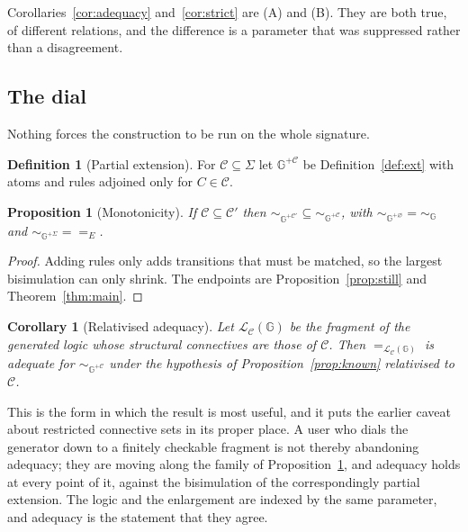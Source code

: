 \documentclass[11pt]{article}
\theoremstyle{plain}
\newtheorem{proposition}[theorem]{Proposition}
\newtheorem{corollary}[theorem]{Corollary}
\theoremstyle{definition}
\newtheorem{definition}[theorem]{Definition}
\newcommand{\Gg}{\mathbb{G}}
\newcommand{\Lo}{\mathcal{L}}
\newcommand{\bis}{\sim}
\begin{document}
Corollaries~\ref{cor:adequacy} and~\ref{cor:strict} are (A) and (B). They are both true, of different
relations, and the difference is a parameter that was suppressed rather than a disagreement.

\subsection{The dial}
\label{sec:dial}

Nothing forces the construction to be run on the whole signature.

\begin{definition}[Partial extension]
For $\mathcal{C} \subseteq \Sigma$ let $\Gg^{+\mathcal{C}}$ be Definition~\ref{def:ext} with atoms and
rules adjoined only for $C \in \mathcal{C}$.
\end{definition}

\begin{proposition}[Monotonicity]
\label{prop:mono}
If $\mathcal{C} \subseteq \mathcal{C}'$ then $\bis_{\Gg^{+\mathcal{C}'}} \subseteq
\bis_{\Gg^{+\mathcal{C}}}$, with $\bis_{\Gg^{+\varnothing}} = \bis_\Gg$ and
$\bis_{\Gg^{+\Sigma}} = {=_E}$.
\end{proposition}

\begin{proof}
Adding rules only adds transitions that must be matched, so the largest bisimulation can only shrink.
The endpoints are Proposition~\ref{prop:still} and Theorem~\ref{thm:main}.
\end{proof}

\begin{corollary}[Relativised adequacy]
Let $\Lo_\mathcal{C}(\Gg)$ be the fragment of the generated logic whose structural connectives are
those of $\mathcal{C}$. Then $=_{\Lo_\mathcal{C}(\Gg)}$ is adequate for $\bis_{\Gg^{+\mathcal{C}}}$
under the hypothesis of Proposition~\ref{prop:known} relativised to $\mathcal{C}$.
\end{corollary}

This is the form in which the result is most useful, and it puts the earlier caveat about restricted
connective sets in its proper place. A user who dials the generator down to a finitely checkable
fragment is not thereby abandoning adequacy; they are moving along the family of
Proposition~\ref{prop:mono}, and adequacy holds at every point of it, against the bisimulation of the
correspondingly partial extension. The logic and the enlargement are indexed by the same parameter,
and adequacy is the statement that they agree.
\end{document}
